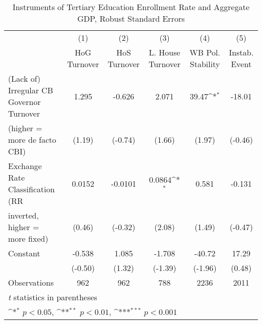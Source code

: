 \begin{table}[htbp]\centering
\def\sym#1{\ifmmode^{#1}\else\(^{#1}\)\fi}
\caption{Instruments of Tertiary Education Enrollment Rate and Aggregate GDP, Robust Standard Errors \label{ifivs2}}
\begin{tabular}{l*{5}{c}}
\toprule
                                        &\multicolumn{1}{c}{(1)}&\multicolumn{1}{c}{(2)}&\multicolumn{1}{c}{(3)}&\multicolumn{1}{c}{(4)}&\multicolumn{1}{c}{(5)}\\
                                        &\multicolumn{1}{c}{HoG Turnover}&\multicolumn{1}{c}{HoS Turnover}&\multicolumn{1}{c}{L. House Turnover}&\multicolumn{1}{c}{WB Pol. Stability}&\multicolumn{1}{c}{Instab. Event}\\
\midrule
(Lack of) Irregular CB Governor Turnover&    1.295         &   -0.626         &    2.071         &    39.47\sym{*}  &   -18.01         \\
(higher = more de facto CBI)            &   (1.19)         &  (-0.74)         &   (1.66)         &   (1.97)         &  (-0.46)         \\
\addlinespace
Exchange Rate Classification (RR        &   0.0152         &  -0.0101         &   0.0864\sym{*}  &    0.581         &   -0.131         \\
inverted, higher = more fixed)          &   (0.46)         &  (-0.32)         &   (2.08)         &   (1.49)         &  (-0.47)         \\
\addlinespace
Constant                                &   -0.538         &    1.085         &   -1.708         &   -40.72         &    17.29         \\
                                        &  (-0.50)         &   (1.32)         &  (-1.39)         &  (-1.96)         &   (0.48)         \\
\midrule
Observations                            &      962         &      962         &      788         &     2236         &     2011         \\
\bottomrule
\multicolumn{6}{l}{\footnotesize \textit{t} statistics in parentheses}\\
\multicolumn{6}{l}{\footnotesize \sym{*} \(p<0.05\), \sym{**} \(p<0.01\), \sym{***} \(p<0.001\)}\\
\end{tabular}
\end{table}

